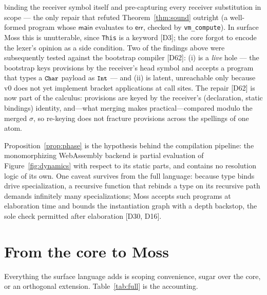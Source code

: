 \documentclass[10pt]{article}
\newcommand{\ksf}[1]{\mathsf{#1}}         %
\newcommand{\smallcode}[1]{\texttt{\small #1}}
\theoremstyle{plain}
\theoremstyle{remark}
\begin{document}
binding the receiver symbol itself and pre-capturing every receiver
substitution in scope --- the only repair that refuted
Theorem~\ref{thm:sound} outright (a well-formed program whose
$\ksf{main}$ evaluates to $\ksf{err}$, checked by \texttt{vm\_compute}).
In surface Moss this is unutterable, since \texttt{This} is a keyword
[D3]; the core forgot to encode the lexer's opinion as a side
condition.  Two of the findings above were subsequently tested against
the bootstrap compiler [D62]: (i) is a \emph{live} hole --- the
bootstrap keys provisions by the receiver's head symbol and accepts a
program that types a $\smallcode{Char}$ payload as
$\smallcode{Int}$ --- and (ii) is latent, unreachable only because v0
does not yet implement bracket applications at call sites. The repair
[D62] is now part of the calculus: provisions are keyed by the receiver's
(declaration, static bindings) identity, and---what merging makes
practical---compared modulo the merged $\sigma$, so re-keying does not
fracture provisions across the spellings of one atom.

Proposition~\ref{prop:phase} is the hypothesis behind the compilation
pipeline: the monomorphizing WebAssembly backend is partial evaluation
of Figure~\ref{fig:dynamics} with respect to its static parts, and
contains no resolution logic of its own. One caveat survives from the
full language: because type binds drive specialization, a recursive
function that rebinds a type on its recursive path demands infinitely
many specializations; Moss accepts such programs at elaboration time and
bounds the instantiation graph with a depth backstop, the sole check
permitted after elaboration [D30, D16].

\section{From the core to Moss}\label{sec:full}

Everything the surface language adds is scoping convenience, sugar over
the core, or an orthogonal extension. Table~\ref{tab:full} is the
accounting.
\end{document}
